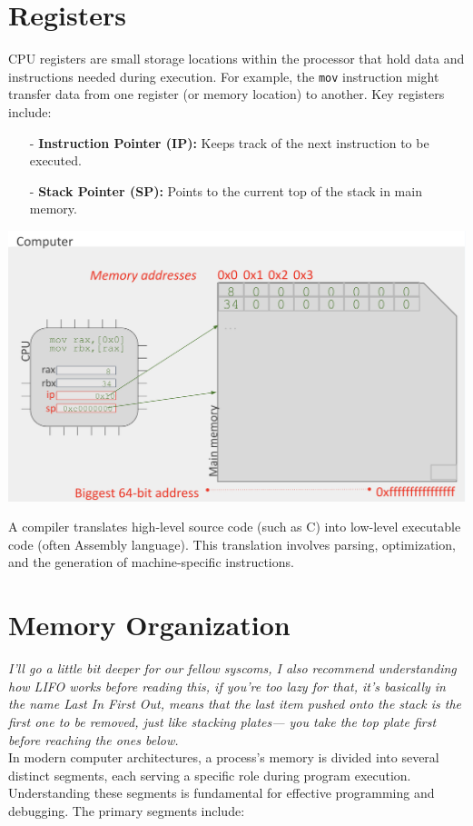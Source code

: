 \section{Registers}
\begin{minipage}{0.45\textwidth}
CPU registers are small storage locations within the processor that hold data and instructions needed during execution. For example, the \texttt{mov} instruction might transfer data from one register (or memory location) to another. Key registers include:
\begin{itemize}
  \item[-] \textbf{Instruction Pointer (IP):} Keeps track of the next instruction to be executed.
  \item[-] \textbf{Stack Pointer (SP):} Points to the current top of the stack in main memory.
\end{itemize}
\end{minipage}
\hfill
\vline
\hfill
\begin{minipage}{0.45\textwidth} 
\begin{center}
    \includegraphics[width=1.1\textwidth]{chapters/L2/images/registers.png}
\end{center}
\end{minipage}
\newpage
\begin{definition}[Compiler]
A compiler translates high-level source code (such as C) into low-level executable code (often Assembly language). This translation involves parsing, optimization, and the generation of machine-specific instructions.
\end{definition}

\section{Memory Organization}
\textit{I'll go a little bit deeper for our fellow syscoms, I also recommend understanding how LIFO works before reading this, if you're too lazy for that, it's basically in the name Last In First Out, means that the last item pushed onto the stack is the first one to be removed, just like stacking plates— you take the top plate first before reaching the ones below. } \\
In modern computer architectures, a process's memory is divided into several distinct segments, each serving a specific role during program execution. Understanding these segments is fundamental for effective programming and debugging. The primary segments include:

